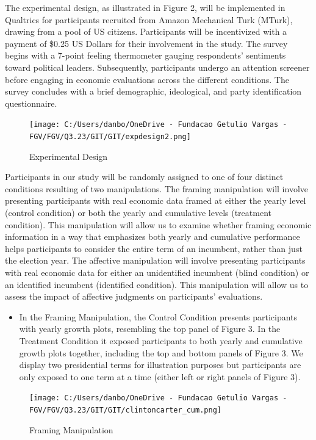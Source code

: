 \documentclass[
]{article}
\providecommand{\tightlist}{%
  \setlength{\itemsep}{0pt}\setlength{\parskip}{0pt}}
\begin{document}
The experimental design, as illustrated in Figure 2, will be implemented
in Qualtrics for participants recruited from Amazon Mechanical Turk
(MTurk), drawing from a pool of US citizens. Participants will be
incentivized with a payment of \$0.25 US Dollars for their involvement
in the study. The survey begins with a 7-point feeling thermometer
gauging respondents' sentiments toward political leaders. Subsequently,
participants undergo an attention screener before engaging in economic
evaluations across the different conditions. The survey concludes with a
brief demographic, ideological, and party identification questionnaire.

\begin{figure}
\hypertarget{fig:label}{%
\centering
\texttt{[image: C:/Users/danbo/OneDrive - Fundacao Getulio Vargas - FGV/FGV/Q3.23/GIT/GIT/expdesign2.png]}
\caption{Experimental Design}\label{fig:label}
}
\end{figure}

Participants in our study will be randomly assigned to one of four
distinct conditions resulting of two manipulations. The framing
manipulation will involve presenting participants with real economic
data framed at either the yearly level (control condition) or both the
yearly and cumulative levels (treatment condition). This manipulation
will allow us to examine whether framing economic information in a way
that emphasizes both yearly and cumulative performance helps
participants to consider the entire term of an incumbent, rather than
just the election year. The affective manipulation will involve
presenting participants with real economic data for either an
unidentified incumbent (blind condition) or an identified incumbent
(identified condition). This manipulation will allow us to assess the
impact of affective judgments on participants' evaluations.

\begin{itemize}
\tightlist
\item
  In the Framing Manipulation, the Control Condition presents
  participants with yearly growth plots, resembling the top panel of
  Figure 3. In the Treatment Condition it exposed participants to both
  yearly and cumulative growth plots together, including the top and
  bottom panels of Figure 3. We display two presidential terms for
  illustration purposes but participants are only exposed to one term at
  a time (either left or right panels of Figure 3).
\end{itemize}

\begin{figure}
\hypertarget{fig:label}{%
\centering
\texttt{[image: C:/Users/danbo/OneDrive - Fundacao Getulio Vargas - FGV/FGV/Q3.23/GIT/GIT/clintoncarter\_cum.png]}
\caption{Framing Manipulation}\label{fig:label}
}
\end{figure}
\end{document}
